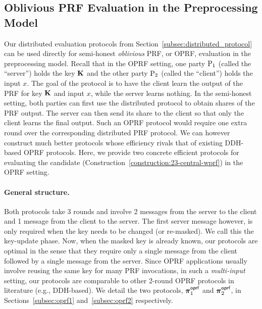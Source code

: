 \iffull
\subsection{Oblivious PRF Evaluation in the Preprocessing Model}
\label{subsec:oprf_protocol}
Our distributed evaluation protocols from Section~\ref{subsec:distributed_protocol} can be used directly for semi-honest \textit{oblivious} PRF, or OPRF, evaluation in the preprocessing model. Recall that in the OPRF setting, one party $\textnormal{P}_1$ (called the ``server'') holds the key $\mat{K}$ and the other party $\textnormal{P}_2$ (called the ``client'') holds the input $x$. The goal of the protocol is to have the client learn the output of the PRF for key $\mat{K}$ and input $x$, while the server learns nothing. In the semi-honest setting, both parties can first use the distributed protocol to obtain shares of the PRF output. The server can then send its share to the client so that only the client learns the final output. Such an OPRF protocol would require one extra round over the corresponding distributed PRF protocol. We can however construct much better protocols whose efficiency rivals that of existing DDH-based OPRF protocols. Here, we provide two concrete efficient protocols for evaluating the \ttwPRF candidate (Construction~\ref{construction:23-central-wprf}) in the OPRF setting. 

\paragraph{General structure.} Both protocols take $3$ rounds and involve 2 messages from the server to the client and 1 message from the client to the server. The first server message however, is only required when the key needs to be changed (or re-masked). We call this the key-update phase. Now, when the masked key is already known, our protocols are optimal in the sense that they require only a single message from the client followed by a single message from the server. Since OPRF applications usually involve reusing the same key for many PRF invocations, in such a \textit{multi-input} setting, our protocols are comparable to other 2-round OPRF protocols in literature (e.g., DDH-based). We detail the two protocols, $\boldsymbol{\pi}^{\textsf{oprf}}_1$ and $\boldsymbol{\pi}^{\textsf{oprf}}_2$, in Sections~\ref{subsec:oprf1} and~\ref{subsec:oprf2} respectively.

